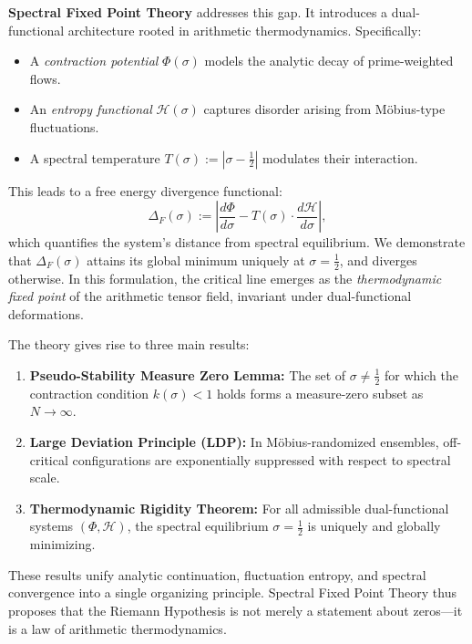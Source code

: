 \documentclass[12pt]{article}
\begin{document}
\medskip

\textbf{Spectral Fixed Point Theory} addresses this gap. It introduces a dual-functional architecture rooted in arithmetic thermodynamics. Specifically:
\begin{itemize}
    \item A \emph{contraction potential} $\Phi(\sigma)$ models the analytic decay of prime-weighted flows.
    \item An \emph{entropy functional} $\mathcal{H}(\sigma)$ captures disorder arising from Möbius-type fluctuations.
    \item A spectral temperature $T(\sigma) := |\sigma - \tfrac{1}{2}|$ modulates their interaction.
\end{itemize}

This leads to a free energy divergence functional:
\[
\Delta_F(\sigma) := \left| \frac{d\Phi}{d\sigma} - T(\sigma) \cdot \frac{d\mathcal{H}}{d\sigma} \right|,
\]
which quantifies the system's distance from spectral equilibrium. We demonstrate that $\Delta_F(\sigma)$ attains its global minimum uniquely at $\sigma = \tfrac{1}{2}$, and diverges otherwise. In this formulation, the critical line emerges as the \emph{thermodynamic fixed point} of the arithmetic tensor field, invariant under dual-functional deformations.

\medskip

The theory gives rise to three main results:
\begin{enumerate}
    \item \textbf{Pseudo-Stability Measure Zero Lemma:} The set of $\sigma \ne \tfrac{1}{2}$ for which the contraction condition $k(\sigma) < 1$ holds forms a measure-zero subset as $N \to \infty$.
    \item \textbf{Large Deviation Principle (LDP):} In Möbius-randomized ensembles, off-critical configurations are exponentially suppressed with respect to spectral scale.
    \item \textbf{Thermodynamic Rigidity Theorem:} For all admissible dual-functional systems $(\Phi, \mathcal{H})$, the spectral equilibrium $\sigma = \tfrac{1}{2}$ is uniquely and globally minimizing.
\end{enumerate}

\medskip

These results unify analytic continuation, fluctuation entropy, and spectral convergence into a single organizing principle. Spectral Fixed Point Theory thus proposes that the Riemann Hypothesis is not merely a statement about zeros—it is a law of arithmetic thermodynamics.
\end{document}
